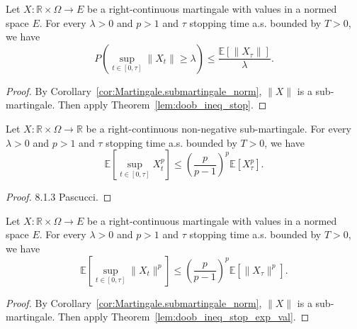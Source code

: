 \begin{corollary}\label{cor:doob_ineq_stop}
  Let $X:\mathbb{R}\times\Omega\rightarrow E$ be a right-continuous martingale with values in a normed space $E$.
  For every $\lambda>0$ and $p>1$ and $\tau$ stopping time a.s. bounded by $T>0$, we have
  $$
  P\left( \sup_{t\in[0,\tau]}\lVert X_t \rVert \geq\lambda \right)\leq \frac{\mathbb{E}[\lVert X_\tau \rVert]}{\lambda}.
  $$
\end{corollary}
\begin{proof}
  By Corollary~\ref{cor:Martingale.submartingale_norm}, $\lVert X \rVert$ is a sub-martingale.
  Then apply Theorem~\ref{lem:doob_ineq_stop}.
\end{proof}

\begin{lemma}\label{lem:doob_ineq_stop_exp_val}
  Let $X:\mathbb{R}\times\Omega\rightarrow \mathbb{R}$ be a right-continuous non-negative sub-martingale.
  For every $\lambda>0$ and $p>1$ and $\tau$ stopping time a.s. bounded by $T>0$, we have
  $$
  \mathbb{E}\left[ \sup_{t\in[0,\tau]}X_t^p \right]\leq \left(\frac{p}{p-1}\right)^p\mathbb{E}[X_\tau^p].
  $$
\end{lemma}
\begin{proof}
  8.1.3 Pascucci.
\end{proof}

\begin{corollary}\label{cor:doob_ineq_stop_exp_val}
  Let $X:\mathbb{R}\times\Omega\rightarrow E$ be a right-continuous martingale with values in a normed space $E$.
  For every $\lambda>0$ and $p>1$ and $\tau$ stopping time a.s. bounded by $T>0$, we have
  $$
  \mathbb{E}\left[ \sup_{t\in[0,\tau]}\lVert X_t \rVert^p \right]\leq \left(\frac{p}{p-1}\right)^p\mathbb{E}[\lVert X_\tau \rVert^p].
  $$
\end{corollary}
\begin{proof}
  By Corollary~\ref{cor:Martingale.submartingale_norm}, $\lVert X \rVert$ is a sub-martingale.
  Then apply Theorem~\ref{lem:doob_ineq_stop_exp_val}.
\end{proof}
